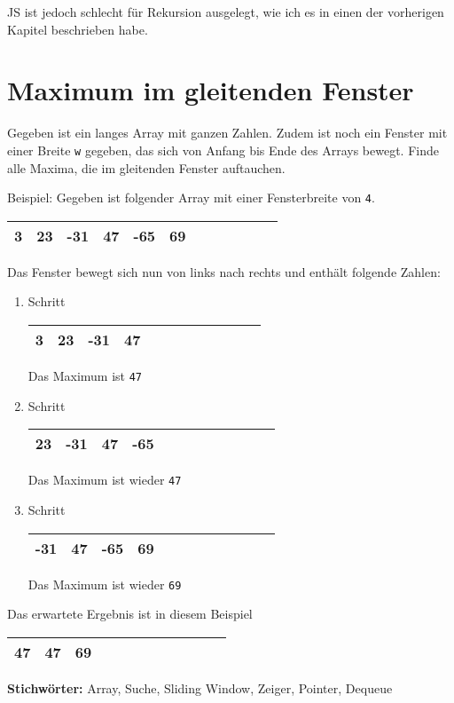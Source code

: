 \documentclass{book}
\begin{document}
JS ist jedoch schlecht für Rekursion ausgelegt, wie ich es in einen der vorherigen Kapitel beschrieben habe.
\section{Maximum im gleitenden Fenster}
\begin{examplei}
Gegeben ist ein langes Array mit ganzen Zahlen. Zudem ist noch ein Fenster mit einer Breite \lstinline|w| gegeben, das sich von Anfang bis Ende des Arrays bewegt. Finde alle Maxima, die im gleitenden Fenster auftauchen.

Beispiel:
Gegeben ist folgender Array mit einer Fensterbreite von \lstinline|4|. 	

\begin{tabular}{|l|l|l|l|l|l|l|l|l|l|l|l|} 
\hline
3 & 23 & -31 & 47 & -65 & 69 \\
\hline
\end{tabular}
Das Fenster bewegt sich nun von links nach rechts und enthält folgende Zahlen:
\begin{enumerate}
\item Schritt

\begin{tabular}{|l|l|l|l|l|l|l|l|l|l|l|l|} 
\hline
3 & 23 & -31 & 47 \\
\hline
\end{tabular}

Das Maximum ist \lstinline|47|
\item Schritt

\begin{tabular}{|l|l|l|l|l|l|l|l|l|l|l|l|} 
\hline
23 & -31 & 47 & -65 \\
\hline
\end{tabular}

Das Maximum ist wieder \lstinline|47|	

\item Schritt
		
\begin{tabular}{|l|l|l|l|l|l|l|l|l|l|l|l|} 
\hline
-31 & 47 & -65 & 69 \\
\hline
\end{tabular}

Das Maximum ist wieder \lstinline|69|
\end{enumerate}

Das erwartete Ergebnis ist in diesem Beispiel 
\begin{tabular}{|l|l|l|l|l|l|l|l|l|l|l|l|} 
	\hline
	47 & 47 & 69 \\
	\hline
\end{tabular}

\end{examplei}
{\bf Stichwörter:} Array, Suche, Sliding Window, Zeiger, Pointer, Dequeue
\end{document}
